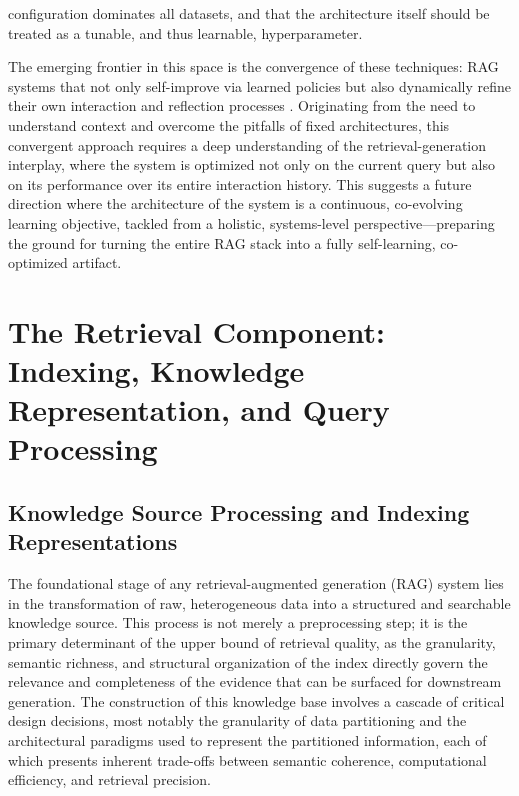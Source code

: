 \documentclass[11pt,a4paper]{article}
\begin{document}
configuration dominates all datasets, and that the architecture itself should be treated as a tunable, and thus learnable, hyperparameter.

The emerging frontier in this space is the convergence of these techniques: RAG systems that not only self-improve via learned policies but also dynamically refine their own interaction and reflection processes \cite{arxiv:2409.19019v1}. Originating from the need to understand context and overcome the pitfalls of fixed architectures, this convergent approach requires a deep understanding of the retrieval-generation interplay, where the system is optimized not only on the current query but also on its performance over its entire interaction history. This suggests a future direction where the architecture of the system is a continuous, co-evolving learning objective, tackled from a holistic, systems-level perspective---preparing the ground for turning the entire RAG stack into a fully self-learning, co-optimized artifact.


\section{The Retrieval Component: Indexing, Knowledge Representation, and Query Processing}



\subsection{Knowledge Source Processing and Indexing Representations}


The foundational stage of any retrieval-augmented generation (RAG) system lies in the transformation of raw, heterogeneous data into a structured and searchable knowledge source. This process is not merely a preprocessing step; it is the primary determinant of the upper bound of retrieval quality, as the granularity, semantic richness, and structural organization of the index directly govern the relevance and completeness of the evidence that can be surfaced for downstream generation. The construction of this knowledge base involves a cascade of critical design decisions, most notably the granularity of data partitioning and the architectural paradigms used to represent the partitioned information, each of which presents inherent trade-offs between semantic coherence, computational efficiency, and retrieval precision.
\end{document}
